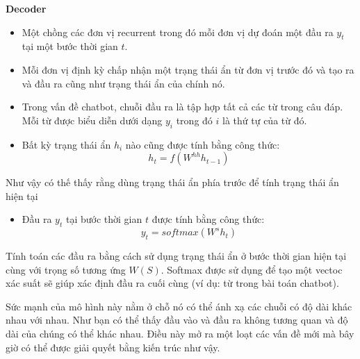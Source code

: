 \textbf{Decoder}
\begin{itemize}
    \item Một chồng các đơn vị recurrent trong đó mỗi đơn vị dự đoán một đầu ra \(y_t\) tại một bước thời gian \(t\).
    \item Mỗi đơn vị định kỳ chấp nhận một trạng thái ẩn từ đơn vị trước đó và tạo ra và đầu ra cũng như trạng thái ẩn
    của chính nó.
    \item Trong vấn đề chatbot, chuỗi đầu ra là tập hợp tất cả các từ trong câu đáp. Mỗi từ được biểu diễn
    dưới dạng \(y_i\) trong đó \(i\) là thứ tự của từ đó.
    \item Bất kỳ trạng thái ẩn \(h_i\) nào cũng được tính bằng công thức:
        \[h_t=f(W^{hh}h_{t-1})\]
\end{itemize}
Như vậy có thế thấy rằng dùng trạng thái ẩn phía trước để tính trạng thái ẩn hiện tại
\begin{itemize}
    \item Đầu ra \(y_t\) tại bước thời gian \(t\) được tính bằng công thức:
        \[y_t=softmax(W^{s}h_{t})\]
\end{itemize}
Tính toán các đầu ra bằng cách sử dụng trạng thái ẩn ở bước thời gian hiện tại cùng với trọng số tương ứng
\(W(S)\). Softmax được sử dụng để tạo một vectoc xác suất sẽ giúp xác định đầu ra cuối cùng (ví dụ: từ
trong bài toán chatbot).

Sức mạnh của mô hình này nằm ở chỗ nó có thể ánh xạ các chuỗi có độ dài khác nhau với nhau. Như bạn có thể thấy đầu
vào và đầu ra không tương quan và độ dài của chúng có thể khác nhau. Điều này mở ra một loạt các vấn đề mới mà  bây
giờ có thể được giải quyết bằng kiến trúc như vậy.